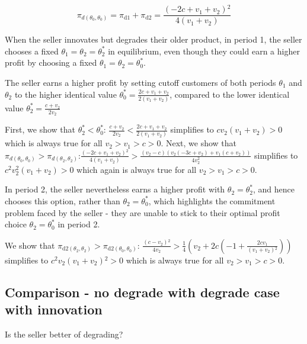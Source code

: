 \documentclass{article}
\begin{document}
\begin{equation}
\pi _{d\left(\theta _0,\theta _0\right)}=\pi _{\text{d1}}+\pi _{\text{d2}}=\frac{\left(-2 c+v_1+v_2\right){}^2}{4 \left(v_1+v_2\right)}
\end{equation}

When the seller innovates but degrades their older product, in period 1, the seller chooses a fixed \(\theta _1=\theta _2=\theta
_2^*\) in equilibrium, even though they could earn a higher profit by choosing a fixed \(\theta _1=\theta _2=\theta _0^*\).

The seller earns a higher profit by setting cutoff customers of both periods \(\theta _1\) and \(\theta _2\) to the higher identical value \(\theta
_0^*=\frac{2 c+v_1+v_2}{2 \left(v_1+v_2\right)}\), compared to the lower identical value \(\theta _2^*=\frac{c+v_2}{2 v_2}\)

First, we show that \(\theta _2^*<\theta _0^*\): \(\frac{c+v_2}{2 v_2}<\frac{2 c+v_1+v_2}{2 \left(v_1+v_2\right)}\) simplifies to \(c
v_2 \left(v_1+v_2\right)>0\) which is always true for all \(v_2>v_1>c>0\). Next, we show that \(\pi _{d\left(\theta _0,\theta _0\right)}>\pi _{d\left(\theta
_2,\theta _2\right)}\):\(\frac{\left(-2 c+v_1+v_2\right){}^2}{4 \left(v_1+v_2\right)}>\frac{\left(v_2-c\right) \left(v_2 \left(-3 c+v_2\right)+v_1
\left(c+v_2\right)\right)}{4 v_2^2}\) simplifies to \(c^2 v_2^2 \left(v_1+v_2\right)>0\) which again is always true for all \(v_2>v_1>c>0\).

In period 2, the seller nevertheless earns a higher profit with \(\theta _2=\theta _2^*\), and hence chooses this option, rather than \(\theta _2=\theta
_0^*\), which highlights the commitment problem faced by the seller - they are unable to stick to their optimal profit choice \(\theta _2=\theta
_0^*\) in period 2. 

 We show that \(\pi _{\text{d2}\left(\theta _2,\theta _2\right)}>\pi _{\text{d2}\left(\theta _0,\theta _0\right)}\): \(\frac{\left(c-v_2\right){}^2}{4
v_2}>\frac{1}{4} \left(v_2+2 c \left(-1+\frac{2 c v_1}{\left(v_1+v_2\right){}^2}\right)\right)\) simplifies to \(c^2 v_2 \left(v_1+v_2\right){}^2>0\)
which is always true for all \(v_2>v_1>c>0\). 

\subsection*{Comparison - no degrade with degrade case with innovation}

Is the seller better of degrading?
\end{document}
